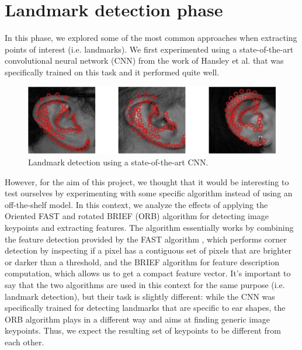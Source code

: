 \documentclass{article}
\begin{document}
\section{Landmark detection phase}

In this phase, we explored some of the most common approaches when extracting points
of interest (i.e. landmarks). We first experimented using a state-of-the-art convolutional neural network
(CNN) from the work of Hansley et al. that was specifically trained on this task and it performed quite well.

\begin{figure}[h]
    \label{fig:landmark}
    \begin{center}
        \includegraphics[width=12cm,keepaspectratio]{images/landmark2.png}
        \caption{Landmark detection using a state-of-the-art CNN.}
    \end{center}
\end{figure}

However, for the aim of this project, we thought that it would be interesting to test ourselves
by experimenting with some specific algorithm instead of using an off-the-shelf model. In this context,
we analyze the effects of applying the Oriented FAST and rotated BRIEF (ORB) algorithm \cite{conf/iccv/RubleeRKB11}
for detecting
image keypoints and extracting features. The algorithm essentially works by combining the feature detection
provided by the FAST algorithm \cite{rosten_2006_machine}, which performs corner detection by inspecting if a pixel
has a contiguous
set of pixels that are brighter or darker than a threshold, and the BRIEF algorithm \cite{Calonder:2010:BBR:1888089.1888148}
for feature description
computation, which allows us to get a compact feature vector. It's important to say that the two
algorithms are used in this context for the same purpose (i.e. landmark detection), but their task is
slightly different: while the CNN was specifically trained for detecting landmarks that are specific to ear
shapes, the ORB algorithm plays in a different way and aims at finding generic image keypoints. Thus,
we expect the resulting set of keypoints to be different from each other.
\end{document}
